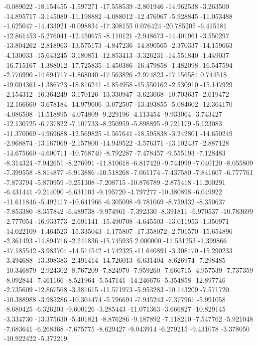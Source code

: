 -0.089022
-18.154455
-1.597271
-17.558539
-2.801946
-14.962538
-3.263500
-14.895717
-3.145080
-11.198882
-4.088012
-12.476967
-5.928845
-11.053488
-1.625047
-14.433921
-0.098834
-17.308155
0.076424
-20.785205
-6.415181
-12.861453
-5.276041
-12.450675
-8.110121
-2.948673
-14.401961
-3.550297
-13.804262
-2.818963
-13.575173
-4.847236
-14.890565
-2.370337
-14.159663
-4.130033
-15.643245
-3.180851
-12.853413
-3.326231
-14.551840
-1.449037
-16.715167
-1.388012
-17.725835
-1.450386
-16.479858
-1.482098
-16.547594
-2.776990
-14.694717
-1.868040
-17.563826
-2.974823
-17.156584
0.744518
-19.004361
-1.386723
-18.816241
-1.854958
-15.550162
-2.530910
-15.147929
-2.154312
-16.364249
-3.170126
-13.330947
-3.623068
-10.703637
-2.619472
-12.166660
-3.678184
-14.979606
-3.072507
-13.493855
-5.084602
-12.364170
-4.086508
-11.518895
-4.074809
-9.229196
-4.113454
-9.933064
-3.743427
-12.130725
-6.737822
-7.107733
-8.250959
-5.898895
-9.721179
-5.123083
-11.370069
-4.969688
-12.569825
-1.567641
-18.595838
-3.242801
-14.650249
-2.968874
-13.167069
-2.157800
-14.949522
-3.576371
-13.102437
-2.887128
-14.675660
-4.600711
-10.768740
-8.792287
-7.478457
-9.555193
-7.128483
-8.314324
-7.942651
-8.276991
-11.810618
-6.817420
-9.744999
-7.040120
-8.055809
-7.399558
-8.814877
-6.913886
-10.518268
-7.061174
-7.437580
-7.841607
-6.777761
-7.873794
-5.870959
-9.251308
-7.208715
-10.876789
-2.875418
-11.200291
-6.431441
-9.214090
-6.631103
-9.195720
-4.797277
-10.380898
-6.049922
-11.611846
-5.492417
-10.641966
-6.305098
-9.781069
-8.759332
-8.350637
-7.853380
-8.357842
-6.489738
-9.974961
-7.392330
-8.391811
-6.970537
-10.783699
-2.777054
-16.933773
-2.691141
-15.490708
-4.645503
-13.011953
-1.350971
-14.022109
-1.464523
-15.335043
-1.175807
-17.358072
-2.701570
-15.654896
-2.361493
-14.894716
-2.241836
-15.745935
2.000000
-17.531253
-1.399866
-17.185542
-3.983704
-14.514542
-4.742325
-11.640891
-3.308470
-15.290233
-3.494688
-13.308383
-2.491414
-14.726013
-6.631404
-8.626974
-7.298485
-10.346879
-2.924302
-8.767209
-7.824970
-7.959260
-7.666715
-4.957539
-7.737359
-8.092844
-7.461166
-8.521964
-5.547141
-14.246676
-5.354858
-12.897746
-2.735609
-12.867568
-3.381615
-11.571973
-5.953283
-10.143209
-7.571720
-10.388988
-3.985286
-10.304474
-5.796694
-7.945243
-7.377961
-5.991058
-8.680425
-6.326203
-9.600126
-3.285443
-11.071363
-3.666827
-10.829145
-3.334730
-13.375630
-5.401821
-8.876286
-9.187892
-7.118210
-7.547762
-5.921048
-7.683641
-6.268368
-7.675775
-8.629427
-9.043914
-6.279215
-9.431078
-3.378050
-10.922422
-5.372219
